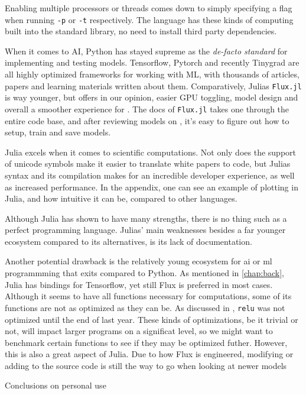 Enabling multiple processors or threads comes down to simply specifying a flag when running \texttt{-p} or \texttt{-t} respectively. The language has these kinds of computing built into the standard library, no need to install third party dependencies. 

When it comes to AI, Python has stayed supreme as the \textit{de-facto standard} for implementing and testing models. Tensorflow, Pytorch and recently Tinygrad are all highly optimized frameworks for working with ML, with thousands of articles, papers and learning materials written about them. Comparatively, Julias \texttt{Flux.jl} is way younger, but offers in our opinion, easier GPU toggling, model design and overall a smoother experience for . The docs of \texttt{Flux.jl} takes one through the entire code base, and after reviewing models on \cite{https://github.com/FluxML/model-zoo}, it's easy to figure out how to setup, train and save models.

Julia excels when it comes to scientific computations. Not only does the support of unicode symbols make it easier to translate white papers to code, but Julias syntax and its compilation makes for an incredible developer experience, as well as increased performance. In the appendix, one can see an example of plotting in Julia, and how intuitive it can be, compared to other languages.






Although Julia has shown to have many strengths, there is no thing such as a perfect programming language. Julias' main weaknesses besides a far younger ecosystem compared to its alternatives, is its lack of documentation. 

Another potential drawback is the relatively young ecosystem for \acrshort{ai} or \acrshort{ml} programmming that exits compared to Python. As mentioned in \ref{chap:back}, Julia has bindings for Tensorflow, yet still Flux is preferred in most cases. Although it seems to have all functions necessary for computations, some of its functions are not as optimized as they can be. As discussed in \cite{projthesis}, \lstinline|relu| was not optimized until the end of last year. These kinds of optimizations, be it trivial or not, will impact larger programs on a significat level, so we might want to benchmark certain functions to see if they may be optimized futher. However, this is also a great aspect of Julia. Due to how Flux is engineered, modifying or adding to the source code is still the way to go when looking at newer models


Conclusions on personal use 